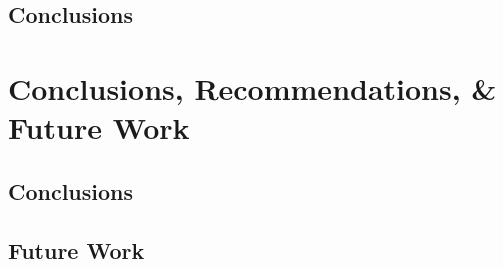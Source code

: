   \section{Conclusions}\label{sec:}
    \lipsum[12-13]
                
\chapter{Conclusions, Recommendations, \& Future Work}\label{ch:Conclusions}
  \section{Conclusions}\label{sec:}
    \lipsum[34-36]
  \section{Future Work}\label{sec:}
    \lipsum[38]\cite{TEST}
	
  \printreferences 


\bigskip 
\clearpage

 \singlespacing                %
 
\printbibliography[heading=bibintoc]
\bigskip

\appendix
 \truedoublespacing            %

